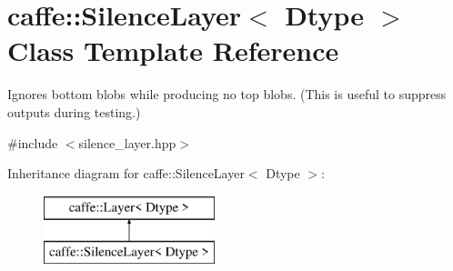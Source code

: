\hypertarget{classcaffe_1_1SilenceLayer}{}\section{caffe\+:\+:Silence\+Layer$<$ Dtype $>$ Class Template Reference}
\label{classcaffe_1_1SilenceLayer}


Ignores bottom blobs while producing no top blobs. (This is useful to suppress outputs during testing.)  




{\ttfamily \#include $<$silence\+\_\+layer.\+hpp$>$}

Inheritance diagram for caffe\+:\+:Silence\+Layer$<$ Dtype $>$\+:\begin{figure}[H]
\begin{center}
\leavevmode
\includegraphics[height=2.000000cm]{classcaffe_1_1SilenceLayer}
\end{center}
\end{figure}
